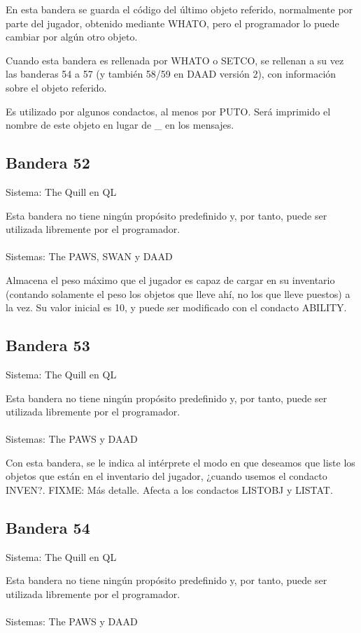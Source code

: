 \documentclass[11pt, a5paper]{article}
\newcommand{\quill}{\textsf{The Quill}\xspace}
\newcommand{\paw}{\textsf{The PAWS}\xspace}
\newcommand{\swan}{\textsf{SWAN}\xspace}
\newcommand{\daad}{\textsf{DAAD}\xspace}
\newcommand{\sistema}[1]{\noindent Sistema: #1 \nopagebreak}
\newcommand{\sistemas}[1]{\noindent Sistemas: #1 \nopagebreak}
\begin{document}
En esta bandera se guarda el código del último objeto referido, normalmente por parte del jugador, obtenido mediante WHATO, pero el programador lo puede cambiar por algún otro objeto.

Cuando esta bandera es rellenada por WHATO o SETCO, se rellenan a su vez las banderas 54 a 57 (y también 58/59 en \daad versión 2), con información sobre el objeto referido.

Es utilizado por algunos condactos, al menos por PUTO. Será imprimido el nombre de este objeto en lugar de \_ en los mensajes.

\subsection{Bandera 52}

\sistema{\quill en QL}

Esta bandera no tiene ningún propósito predefinido y, por tanto, puede ser utilizada libremente por el programador.
\\\ \\
\sistemas{\paw, \swan y \daad}

Almacena el peso máximo que el jugador es capaz de cargar en su inventario (contando solamente el peso los objetos que lleve ahí, no los que lleve puestos) a la vez. Su valor inicial es 10, y puede ser modificado con el condacto ABILITY.

\subsection{Bandera 53}

\sistema{\quill en QL}

Esta bandera no tiene ningún propósito predefinido y, por tanto, puede ser utilizada libremente por el programador.
\\\ \\
\sistemas{\paw y \daad}

Con esta bandera, se le indica al intérprete el modo en que deseamos que liste los objetos que están en el inventario del jugador, ¿cuando usemos el condacto INVEN?. FIXME: Más detalle. Afecta a los condactos LISTOBJ y LISTAT.

\subsection{Bandera 54}

\sistema{\quill en QL}

Esta bandera no tiene ningún propósito predefinido y, por tanto, puede ser utilizada libremente por el programador.
\\\ \\
\sistemas{\paw y \daad}
\end{document}
